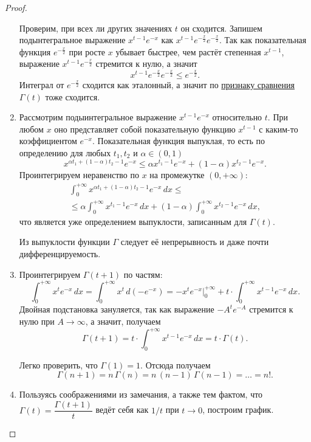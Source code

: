 \begin{proof}
\begin{enumerate}
		Проверим, при всех ли других значениях \(t\) он сходится. Запишем подынтегральное выражение \(x^{t - 1} e^{-x}\) как \(x^{t - 1} e^{-\frac{x}{2}} e^{-\frac{x}{2}}\). Так как показательная функция \(e^{-\frac{x}{2}}\) при росте \(x\) убывает быстрее, чем растёт степенная \(x^{t - 1}\), выражение \(x^{t - 1} e^{-\frac{x}{2}}\) стремится к нулю, а значит \[
		x^{t - 1} e^{-\frac{x}{2}} e^{-\frac{x}{2}} \leqslant  e^{-\frac{x}{2}}.
		\]
		Интеграл от \(e^{-\frac{x}{2}}\) сходится как эталонный, а значит по \hyperlink{priz}{признаку сравнения} \(\Gamma(t)\) тоже сходится.
		\item Рассмотрим подыинтегральное выражение \(x^{t - 1} e^{-x}\) относительно \(t\). При любом \(x\) оно представляет собой показательную функцию \(x^{t - 1}\) с каким-то коэффициентом \(e^{-x}\).
		Показательная функция выпуклая, то есть по определению для любых \(t_1, t_2\) и \(\alpha \in (0, 1)\) \[
		x^{\alpha t_1 + (1 - \alpha) t_2 - 1} e^{-x} \leqslant \alpha x^{t_1 - 1} e^{-x} + (1 - \alpha) x^{t_2 - 1} e^{-x}.
		\]
		Проинтегрируем неравенство по \(x\) на промежутке \((0, +\infty)\): 
		\begin{multline*}
			\int_0^{+\infty} x^{\alpha t_1 + (1 - \alpha) t_2 - 1} e^{-x} \, dx \leqslant \\
			\leqslant \alpha \int_0^{+\infty} x^{t_1 - 1} e^{-x} \, dx + (1 - \alpha) \int_0^{+\infty} x^{t_2 - 1} e^{-x} \, dx,
		\end{multline*}
		что является уже определением выпуклости, записанным для \(\Gamma(t)\).
		\begin{remark}
			Из выпуклости функции \(\Gamma\) следует её непрерывность и даже почти дифференцируемость.
		\end{remark}
		\item Проинтегрируем \(\Gamma(t + 1)\) по частям: \[
		\int_{0}^{+\infty} x^t e^{-x} \, dx = \int_{0}^{+\infty} x^t \, d(-e^{-x}) = -x^t e^{-x} \bigg|_0^{+\infty} + t \cdot \int_{0}^{+\infty} x^{t - 1} e^{-x} \, dx.
		\]
		Двойная подстановка зануляется, так как выражение \(-A^t e^{-A}\) стремится к нулю при \(A \to \infty\), а значит, получаем \[
		\Gamma(t + 1) = t \cdot \int_{0}^{+\infty} x^{t - 1} e^{-x} \, dx = t \cdot \Gamma(t).
		\]
		\begin{remark}
			Легко проверить, что \(\Gamma(1) = 1\). Отсюда получаем \[
				\Gamma(n + 1) = n \, \Gamma(n) = n \, (n - 1) \, \Gamma(n - 1) = \ldots = n!.
		\]
		\end{remark}
		\item Пользуясь соображениями из замечания, а также тем фактом, что \(\Gamma(t) = \dfrac{\Gamma(t + 1)}{t}\) ведёт себя как \(1/t\) при \(t \to 0\), построим график.
		

\end{enumerate}
\end{proof}
